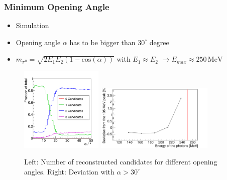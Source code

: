 \documentclass[slidestop,compress,mathserif]{beamer}
\begin{document}
\begin{frame}
	\frametitle{Minimum Opening Angle}
	\begin{itemize}
		\item Simulation
		\item Opening angle $\alpha$ has to be bigger than $30^{\circ}$ degree
		\item $m_{\pi^0}=\sqrt{2 E_1 E_2 (1-\text{cos}(\alpha))}$ with $E_1 \approx E_2$ $\rightarrow E_{max}\approx 250 \, \text{MeV}$
	\end{itemize}

	\begin{figure}
		\includegraphics[width=0.35\textwidth]{Pictures/MCClusteringCheck_nCandsOpAng}
		\includegraphics[width=0.50\textwidth]{Pictures/20170505MinAngle30Deviation}
		\caption{Left: Number of reconstructed candidates for different opening angles. Right: Deviation with $\alpha > 30 ^{\circ}$ }
	\end{figure}
	
\end{frame}
\end{document}
